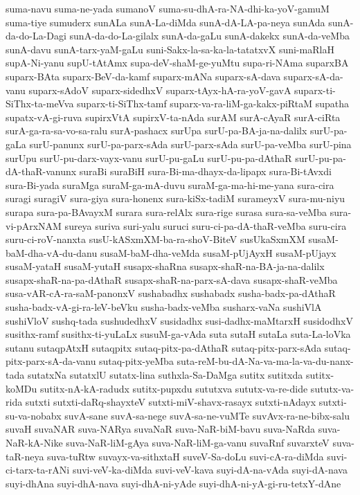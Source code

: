 {suma-navu
suma-ne-yada
sumanoV
suma-su-dhA-ra-NA-dhi-ka-yoV-gamuM
suma-tiye
sumuderx
sunALa
sunA-La-diMda
sunA-dA-LA-pa-neya
sunAda
sunA-da-do-La-Dagi
sunA-da-do-La-gilalx
sunA-da-gaLu
sunA-dakekx
sunA-da-veMba
sunA-davu
sunA-tarx-yaM-gaLu
suni-Sakx-la-sa-ka-la-tatatxvX
suni-maRlaH
supA-Ni-yanu
supU-tAtAmx
supa-deV-shaM-ge-yuMtu
supa-ri-NAma
suparxBA
suparx-BAta
suparx-BeV-da-kamf
suparx-mANa
suparx-sA-dava
suparx-sA-da-vanu
suparx-sAdoV
suparx-sidedhxV
suparx-tAyx-hA-ra-yoV-gavA
suparx-ti-SiThx-ta-meVva
suparx-ti-SiThx-tamf
suparx-va-ra-liM-ga-kakx-piRtaM
supatha
supatx-vA-gi-ruva
supirxVtA
supirxV-ta-nAda
surAM
surA-cAyaR
surA-ciRta
surA-ga-ra-sa-vo-sa-ralu
surA-pashacx
surUpa
surU-pa-BA-ja-na-dalilx
surU-pa-gaLa
surU-panunx
surU-pa-parx-sAda
surU-parx-sAda
surU-pa-veMba
surU-pina
surUpu
surU-pu-darx-vayx-vanu
surU-pu-gaLu
surU-pu-pa-dAthaR
surU-pu-pa-dA-thaR-vanunx
suraBi
suraBiH
sura-Bi-ma-dhayx-da-lipapx
sura-Bi-tAvxdi
sura-Bi-yada
suraMga
suraM-ga-mA-duvu
suraM-ga-ma-hi-me-yana
sura-cira
suragi
suragiV
sura-giya
sura-honenx
sura-kiSx-tadiM
surameyxV
sura-mu-niyu
surapa
sura-pa-BAvayxM
surara
sura-relAlx
sura-rige
surasa
sura-sa-veMba
sura-vi-pArxNAM
sureya
suriva
suri-yalu
suruci
suru-ci-pa-dA-thaR-veMba
suru-cira
suru-ci-roV-nanxta
susU-kASxmXM-ba-ra-shoV-BiteV
susUkaSxmXM
susaM-baM-dha-vA-du-danu
susaM-baM-dha-veMda
susaM-pUjAyxH
susaM-pUjayx
susaM-yataH
susaM-yutaH
susapx-shaRna
susapx-shaR-na-BA-ja-na-dalilx
susapx-shaR-na-pa-dAthaR
susapx-shaR-na-parx-sA-dava
susapx-shaR-veMba
susa-vAR-cA-ra-saM-panonxV
sushabadhx
sushabadx
susha-badx-pa-dAthaR
susha-badx-vA-gi-ra-leV-beVku
susha-badx-veMba
susharx-vaNa
sushiVlA
sushiVloV
sushq-tada
sushudedhxV
susidadhx
susi-dadhx-maMtarxH
susidodhxV
susithx-ramf
susithx-ti-yuLaLx
susuM-ga-vAda
suta
sutaH
sutaLa
suta-La-loVka
sutanu
sutaqpAtxH
sutaqpitx
sutaq-pitx-pa-dAthaR
sutaq-pitx-parx-sAda
sutaq-pitx-parx-sA-da-vanu
sutaq-pitx-yeMba
suta-reM-bu-dA-Na-va-ma-la-va-du-nanx-tada
sutatxNa
sutatxlU
sutatx-lina
suthxla-Sa-DaMga
sutitx
sutitxda
sutitx-koMDu
sutitx-nA-kA-radudx
sutitx-pupxdu
sututxva
sututx-va-re-dide
sututx-va-rida
sutxti
sutxti-daRq-shayxteV
sutxti-miV-shavx-rasayx
sutxti-nAdayx
sutxti-su-va-nobabx
suvA-sane
suvA-sa-nege
suvA-sa-ne-vuMTe
suvAvx-ra-ne-bibx-salu
suvaH
suvaNAR
suva-NARya
suvaNaR
suva-NaR-biM-bavu
suva-NaRda
suva-NaR-kA-Nike
suva-NaR-liM-gAya
suva-NaR-liM-ga-vanu
suvaRnf
suvarxteV
suva-taR-neya
suva-tuRtw
suvayx-va-sithxtaH
suveV-Sa-doLu
suvi-cA-ra-diMda
suvi-ci-tarx-ta-rANi
suvi-veV-ka-diMda
suvi-veV-kava
suyi-dA-na-vAda
suyi-dA-nava
suyi-dhAna
suyi-dhA-nava
suyi-dhA-ni-yAde
suyi-dhA-ni-yA-gi-ru-tetxY-dAne
}
